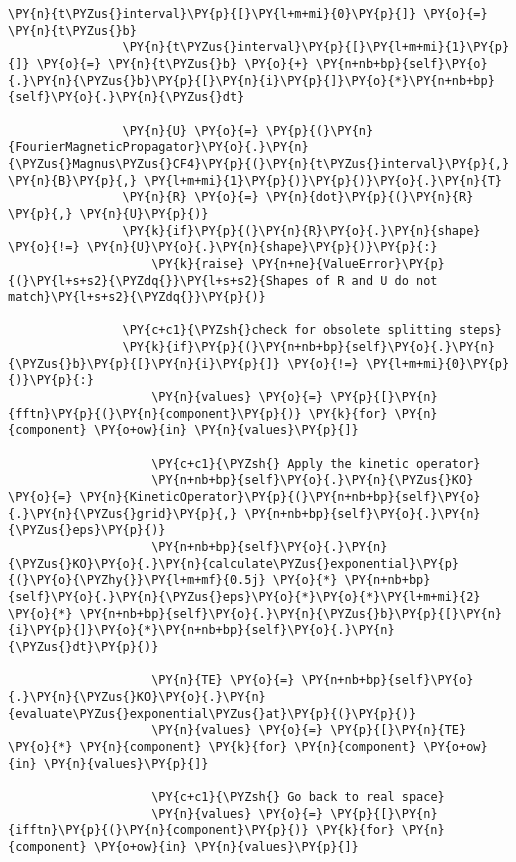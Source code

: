 \begin{Verbatim}[commandchars=\\\{\}]
                \PY{n}{t\PYZus{}interval}\PY{p}{[}\PY{l+m+mi}{0}\PY{p}{]} \PY{o}{=} \PY{n}{t\PYZus{}b}
                \PY{n}{t\PYZus{}interval}\PY{p}{[}\PY{l+m+mi}{1}\PY{p}{]} \PY{o}{=} \PY{n}{t\PYZus{}b} \PY{o}{+} \PY{n+nb+bp}{self}\PY{o}{.}\PY{n}{\PYZus{}b}\PY{p}{[}\PY{n}{i}\PY{p}{]}\PY{o}{*}\PY{n+nb+bp}{self}\PY{o}{.}\PY{n}{\PYZus{}dt}

                \PY{n}{U} \PY{o}{=} \PY{p}{(}\PY{n}{FourierMagneticPropagator}\PY{o}{.}\PY{n}{\PYZus{}Magnus\PYZus{}CF4}\PY{p}{(}\PY{n}{t\PYZus{}interval}\PY{p}{,} \PY{n}{B}\PY{p}{,} \PY{l+m+mi}{1}\PY{p}{)}\PY{p}{)}\PY{o}{.}\PY{n}{T}
                \PY{n}{R} \PY{o}{=} \PY{n}{dot}\PY{p}{(}\PY{n}{R} \PY{p}{,} \PY{n}{U}\PY{p}{)}
                \PY{k}{if}\PY{p}{(}\PY{n}{R}\PY{o}{.}\PY{n}{shape} \PY{o}{!=} \PY{n}{U}\PY{o}{.}\PY{n}{shape}\PY{p}{)}\PY{p}{:}
                    \PY{k}{raise} \PY{n+ne}{ValueError}\PY{p}{(}\PY{l+s+s2}{\PYZdq{}}\PY{l+s+s2}{Shapes of R and U do not match}\PY{l+s+s2}{\PYZdq{}}\PY{p}{)}

                \PY{c+c1}{\PYZsh{}check for obsolete splitting steps}
                \PY{k}{if}\PY{p}{(}\PY{n+nb+bp}{self}\PY{o}{.}\PY{n}{\PYZus{}b}\PY{p}{[}\PY{n}{i}\PY{p}{]} \PY{o}{!=} \PY{l+m+mi}{0}\PY{p}{)}\PY{p}{:}
                    \PY{n}{values} \PY{o}{=} \PY{p}{[}\PY{n}{fftn}\PY{p}{(}\PY{n}{component}\PY{p}{)} \PY{k}{for} \PY{n}{component} \PY{o+ow}{in} \PY{n}{values}\PY{p}{]}

                    \PY{c+c1}{\PYZsh{} Apply the kinetic operator}
                    \PY{n+nb+bp}{self}\PY{o}{.}\PY{n}{\PYZus{}KO} \PY{o}{=} \PY{n}{KineticOperator}\PY{p}{(}\PY{n+nb+bp}{self}\PY{o}{.}\PY{n}{\PYZus{}grid}\PY{p}{,} \PY{n+nb+bp}{self}\PY{o}{.}\PY{n}{\PYZus{}eps}\PY{p}{)}
                    \PY{n+nb+bp}{self}\PY{o}{.}\PY{n}{\PYZus{}KO}\PY{o}{.}\PY{n}{calculate\PYZus{}exponential}\PY{p}{(}\PY{o}{\PYZhy{}}\PY{l+m+mf}{0.5j} \PY{o}{*} \PY{n+nb+bp}{self}\PY{o}{.}\PY{n}{\PYZus{}eps}\PY{o}{*}\PY{o}{*}\PY{l+m+mi}{2} \PY{o}{*} \PY{n+nb+bp}{self}\PY{o}{.}\PY{n}{\PYZus{}b}\PY{p}{[}\PY{n}{i}\PY{p}{]}\PY{o}{*}\PY{n+nb+bp}{self}\PY{o}{.}\PY{n}{\PYZus{}dt}\PY{p}{)}

                    \PY{n}{TE} \PY{o}{=} \PY{n+nb+bp}{self}\PY{o}{.}\PY{n}{\PYZus{}KO}\PY{o}{.}\PY{n}{evaluate\PYZus{}exponential\PYZus{}at}\PY{p}{(}\PY{p}{)}
                    \PY{n}{values} \PY{o}{=} \PY{p}{[}\PY{n}{TE} \PY{o}{*} \PY{n}{component} \PY{k}{for} \PY{n}{component} \PY{o+ow}{in} \PY{n}{values}\PY{p}{]}

                    \PY{c+c1}{\PYZsh{} Go back to real space}
                    \PY{n}{values} \PY{o}{=} \PY{p}{[}\PY{n}{ifftn}\PY{p}{(}\PY{n}{component}\PY{p}{)} \PY{k}{for} \PY{n}{component} \PY{o+ow}{in} \PY{n}{values}\PY{p}{]}


\end{Verbatim}
